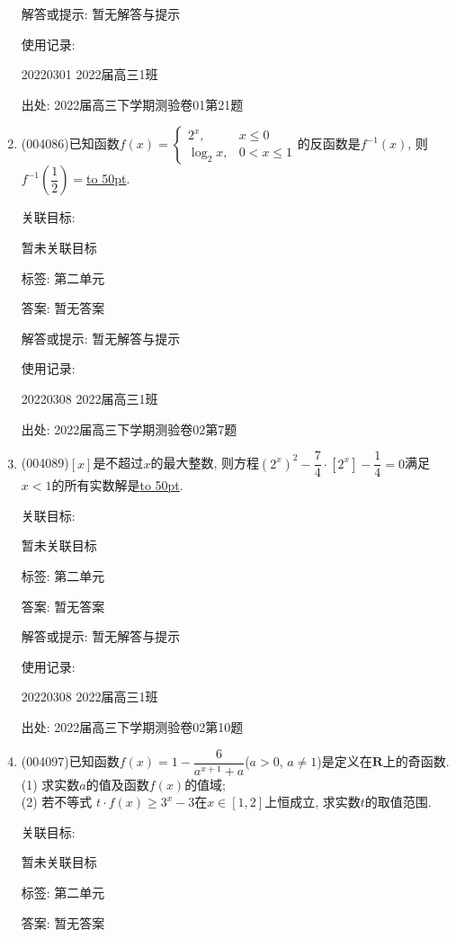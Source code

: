 \documentclass[10pt,a4paper]{article}
\newcommand{\blank}[1]{\underline{\hbox to #1pt{}}}
\begin{document}
\begin{enumerate}[1.]
解答或提示: 暂无解答与提示

使用记录:

20220301	2022届高三1班			


出处: 2022届高三下学期测验卷01第21题
\item { (004086)}已知函数$f(x)=\begin{cases} 2^x, & x\le 0 \\  \log_2x, & 0<x\le 1 \end{cases}$的反函数是$f^{-1}(x)$, 则$f^{-1}(\dfrac 12)=$\blank{50}.


关联目标:

暂未关联目标



标签: 第二单元

答案: 暂无答案

解答或提示: 暂无解答与提示

使用记录:

20220308	2022届高三1班	


出处: 2022届高三下学期测验卷02第7题
\item { (004089)}$[x]$是不超过$x$的最大整数, 则方程$(2^x)^2-\dfrac 74\cdot [2^x]-\dfrac 14=0$满足$x<1$的所有实数解是\blank{50}.


关联目标:

暂未关联目标



标签: 第二单元

答案: 暂无答案

解答或提示: 暂无解答与提示

使用记录:

20220308	2022届高三1班	


出处: 2022届高三下学期测验卷02第10题
\item { (004097)}已知函数$f(x)=1-\dfrac 6{a^{x+1}+a}$($a>0$, $a\ne 1$)是定义在$\mathbf{R}$上的奇函数.\\
(1) 求实数$a$的值及函数$f(x)$的值域;\\
(2) 若不等式 $t\cdot f(x)\ge 3^x-3$在$x\in [1,2]$上恒成立, 求实数$t$的取值范围.


关联目标:

暂未关联目标



标签: 第二单元

答案: 暂无答案


\end{enumerate}
\end{document}
